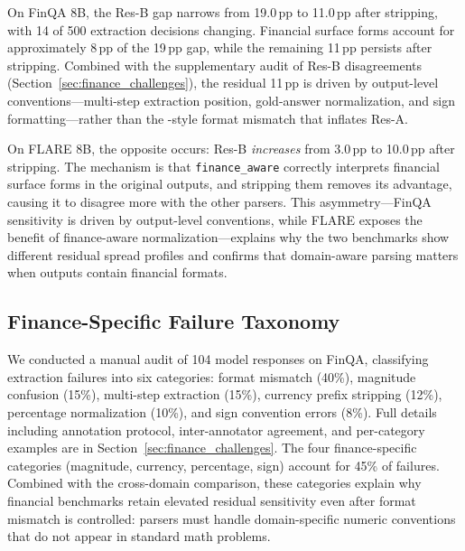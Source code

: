 On FinQA 8B, the Res-B gap narrows from 19.0\,pp to 11.0\,pp after stripping, with 14 of 500 extraction decisions changing. Financial surface forms account for approximately 8\,pp of the 19\,pp gap, while the remaining 11\,pp persists after stripping. Combined with the supplementary audit of Res-B disagreements (Section~\ref{sec:finance_challenges}), the residual 11\,pp is driven by output-level conventions---multi-step extraction position, gold-answer normalization, and sign formatting---rather than the \boxedparser{}-style format mismatch that inflates Res-A.

On FLARE 8B, the opposite occurs: Res-B \emph{increases} from 3.0\,pp to 10.0\,pp after stripping. The mechanism is that \texttt{finance\_aware} correctly interprets financial surface forms in the original outputs, and stripping them removes its advantage, causing it to disagree more with the other parsers. This asymmetry---FinQA sensitivity is driven by output-level conventions, while FLARE exposes the benefit of finance-aware normalization---explains why the two benchmarks show different residual spread profiles and confirms that domain-aware parsing matters when outputs contain financial formats.

\subsection{Finance-Specific Failure Taxonomy}

We conducted a manual audit of 104 model responses on FinQA, classifying extraction failures into six categories: format mismatch (40\%), magnitude confusion (15\%), multi-step extraction (15\%), currency prefix stripping (12\%), percentage normalization (10\%), and sign convention errors (8\%). Full details including annotation protocol, inter-annotator agreement, and per-category examples are in Section~\ref{sec:finance_challenges}. The four finance-specific categories (magnitude, currency, percentage, sign) account for 45\% of failures. Combined with the cross-domain comparison, these categories explain why financial benchmarks retain elevated residual sensitivity even after format mismatch is controlled: parsers must handle domain-specific numeric conventions that do not appear in standard math problems.
